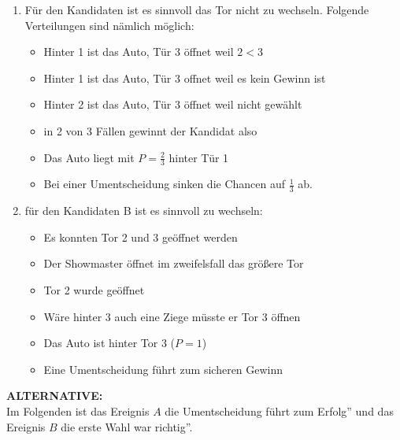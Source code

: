 \begin{enumerate}
	\item Für den Kandidaten ist es sinnvoll das Tor nicht zu wechseln. Folgende Verteilungen sind nämlich möglich:
	\begin{itemize}
		\item Hinter 1 ist das Auto, Tür 3 öffnet weil $ 2<3$ 
		\item Hinter 1 ist das Auto, Tür 3 offnet weil es kein Gewinn ist
		\item Hinter 2 ist das Auto, Tür 3 öffnet weil nicht gewählt 
		\item in 2 von 3 Fällen gewinnt der Kandidat also 
		\item Das Auto liegt mit \(P= \frac{2}{3} \) hinter Tür 1
		\item Bei einer Umentscheidung sinken die Chancen auf \( \frac{1}{3}\) ab.
	\end{itemize}

	\item für den Kandidaten B ist es sinnvoll zu wechseln:
	\begin{itemize}
		\item Es konnten Tor 2 und 3 geöffnet werden
		\item Der Showmaster öffnet im zweifelsfall das größere Tor
		\item Tor 2 wurde geöffnet
		\item Wäre hinter 3 auch eine Ziege müsste er Tor 3 öffnen
		\item Das Auto ist hinter Tor 3 ($P=1$)
		\item Eine Umentscheidung führt zum sicheren Gewinn
	\end{itemize}
\end{enumerate}
\textbf{ALTERNATIVE:}\\
Im Folgenden ist das Ereignis $A$ \glqq die Umentscheidung führt zum Erfolg'' und das Ereignis $B$ \glqq die erste Wahl war richtig''.
